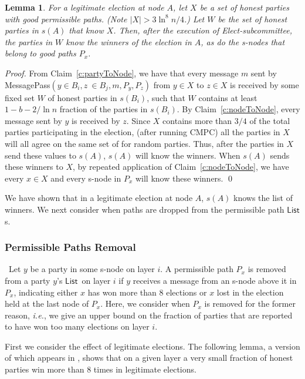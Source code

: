 \documentclass[11pt,letter]{article}
\newcommand{\ie}{\emph{i.e.}}
\theoremstyle{mytheoremstyle}
\newtheorem{lemma}{Lemma}
\newcommand{\hw}{\mbox{\textsf{CMPC}}\xspace}
\newcommand{\MessagePass}{\textsf{MessagePass}}
\newcommand{\lst}{\ensuremath{\mathsf{List}}}
\begin{document}
\begin{lemma}
	\label{l:legitimateElections}
	For a legitimate election at node $A$, let $X$ be a set of honest parties with good permissible paths. (Note $|X| >
	3\ln^8 n/4$.) Let $W$ be the set of honest parties in $s(A)$ that know $X$. Then, after the execution of {\sc Elect-subcommittee}, the parties in $W$ know the winners of the election in $A$, as do the \textsf{s-node}s that belong to good paths $P_x$.
\end{lemma}
\begin{proof}
	From Claim~\ref{c:partyToNode}, we have that every message $m$ sent by \MessagePass$(y \in B_i, z \ \in B_j, m,P_y, P_z)$ from $y\in X$ to $z \in X$ is received by some fixed set $W$ of honest parties in $s(B_i)$, such that $W$ contains at least $1-b-2/\ln n$ fraction of the parties in $s(B_i)$.
	By Claim~\ref{c:nodeToNode}, every message sent by $y$ is received by $z$. Since $X$ contains more than $3/4$ of the total parties participating in the election, (after running \hw) all the parties in $X$ will all agree on the same set of for random parties. Thus, after the parties in $X$ send these values to $s(A)$, $s(A)$ will know the winners. When $s(A)$ sends these winners to $X$, by repeated application of Claim~\ref{c:nodeToNode}, we have every $x \in X$ and every \textsf{s-node} in $P_x$ will know these winners.
	\qed
\end{proof}

We have shown that in a legitimate election at node $A$, $s(A)$ knows the list of winners. We next consider when paths are dropped from the permissible path \lst s.

\subsubsection{Permissible Paths Removal}
\ Let $y$ be a party in some \textsf{s-node} on layer $i$. A permissible path $P_x$ is removed from a party $y$'s \lst\ on layer $i$ if $y$ receives a message from an \textsf{s-node} above it in $P_x$, indicating either $x$ has won more than 8 elections or $x$ lost in the election held at the last node of $P_x$. Here, we consider when $P_x$ is removed for the former reason, \ie, we give an upper bound on the fraction of parties that are reported to have won too many elections on layer $i$.

First we consider the effect of legitimate elections. The following lemma, a version of which appears in \cite{KSSV,King:2006:TSS:1170136.1170491}, shows that on a given layer a very small fraction of honest parties win more than 8 times in legitimate elections.
\end{document}
